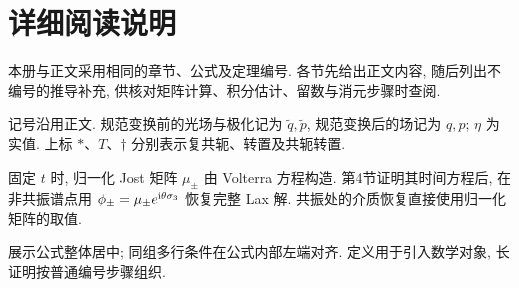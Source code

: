 \section*{详细阅读说明}
本册与正文采用相同的章节、公式及定理编号. 各节先给出正文内容, 随后列出不编号的推导补充, 供核对矩阵计算、积分估计、留数与消元步骤时查阅.

记号沿用正文. 规范变换前的光场与极化记为 $\widetilde q,\widetilde p$, 规范变换后的场记为 $q,p$; $\eta$ 为实值. 上标 $*$、$T$、$\dagger$ 分别表示复共轭、转置及共轭转置.

固定 $t$ 时, 归一化 Jost 矩阵 $\mu_\pm$ 由 Volterra 方程构造. 第4节证明其时间方程后, 在非共振谱点用 $\phi_\pm=\mu_\pm e^{\mathrm{i}\theta\sigma_3}$ 恢复完整 Lax 解. 共振处的介质恢复直接使用归一化矩阵的取值.

展示公式整体居中; 同组多行条件在公式内部左端对齐. 定义用于引入数学对象, 长证明按普通编号步骤组织.
